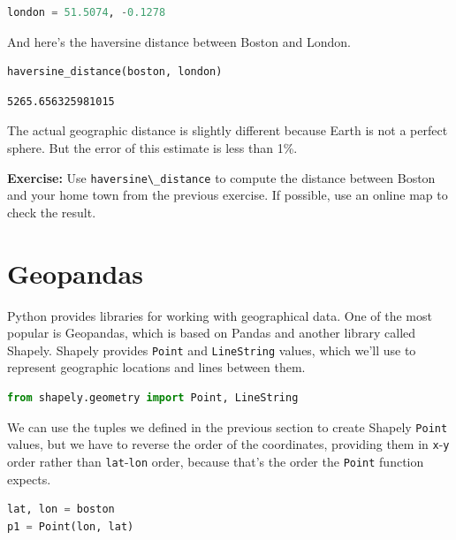 \begin{lstlisting}[language=Python,style=source]
london = 51.5074, -0.1278
\end{lstlisting}

And here's the haversine distance between Boston and London.

\begin{lstlisting}[language=Python,style=source]
haversine_distance(boston, london)
\end{lstlisting}

\begin{lstlisting}[style=output]
5265.656325981015
\end{lstlisting}

The actual geographic distance is slightly different because Earth is
not a perfect sphere. But the error of this estimate is less than 1\%.

\textbf{Exercise:} Use \passthrough{\lstinline!haversine\_distance!} to
compute the distance between Boston and your home town from the previous
exercise. If possible, use an online map to check the result.

\hypertarget{geopandas}{%
\section{Geopandas}\label{geopandas}}

Python provides libraries for working with geographical data. One of the
most popular is Geopandas, which is based on Pandas and another library
called Shapely. Shapely provides \passthrough{\lstinline!Point!} and
\passthrough{\lstinline!LineString!} values, which we'll use to
represent geographic locations and lines between them.

\begin{lstlisting}[language=Python,style=source]
from shapely.geometry import Point, LineString
\end{lstlisting}

We can use the tuples we defined in the previous section to create
Shapely \passthrough{\lstinline!Point!} values, but we have to reverse
the order of the coordinates, providing them in
\passthrough{\lstinline!x!}-\passthrough{\lstinline!y!} order rather
than \passthrough{\lstinline!lat!}-\passthrough{\lstinline!lon!} order,
because that's the order the \passthrough{\lstinline!Point!} function
expects.

\begin{lstlisting}[language=Python,style=source]
lat, lon = boston
p1 = Point(lon, lat)
\end{lstlisting}

